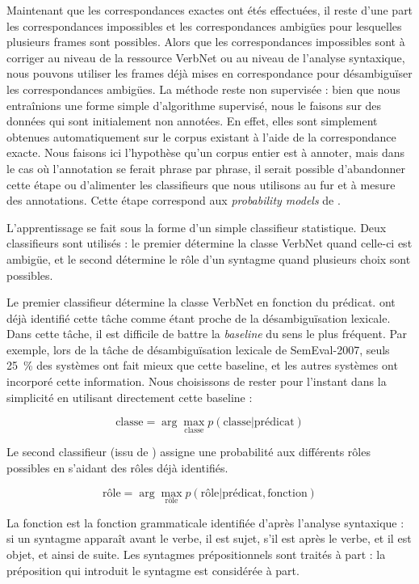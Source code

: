 Maintenant que les correspondances exactes ont étés effectuées, il reste d'une
part les correspondances impossibles et les correspondances ambigües pour
lesquelles plusieurs frames sont possibles. Alors que les correspondances
impossibles sont à corriger au niveau de la ressource VerbNet ou au niveau de
l'analyse syntaxique, nous pouvons utiliser les frames déjà mises en
correspondance pour désambiguïser les correspondances ambigües. La méthode
reste non supervisée : bien que nous entraînions une forme simple d'algorithme
supervisé, nous le faisons sur des données qui sont initialement non annotées.
En effet, elles sont simplement obtenues automatiquement sur le corpus existant
à l'aide de la correspondance exacte. Nous faisons ici l'hypothèse qu'un corpus
entier est à annoter, mais dans le cas où l'annotation se ferait phrase par
phrase, il serait possible d'abandonner cette étape ou d'alimenter les
classifieurs que nous utilisons au fur et à mesure des annotations. Cette étape
correspond aux \textit{probability models} de \citet{swier2004unsupervised}.

L'apprentissage se fait sous la forme d'un simple classifieur statistique. Deux
classifieurs sont utilisés : le premier détermine la classe VerbNet quand
celle-ci est ambigüe, et le second détermine le rôle d'un syntagme quand
plusieurs choix sont possibles.

Le premier classifieur détermine la classe VerbNet en fonction du prédicat.
\citet{abend2008supervised} ont déjà identifié cette tâche comme étant proche
de la désambiguïsation lexicale. Dans cette tâche, il est difficile de battre
la \textit{baseline} du sens le plus fréquent. Par exemple, lors de la tâche de
désambiguïsation lexicale de SemEval-2007, seuls 25~\% des systèmes ont fait
mieux que cette baseline, et les autres systèmes ont incorporé cette
information. Nous choisissons de rester pour l'instant dans la simplicité en
utilisant directement cette baseline :

$$ \text{classe} = \arg\max_{\text{classe}} p(\text{classe} \vert \text{prédicat}) $$

Le second classifieur (issu de \cite{swier2004unsupervised}) assigne une
probabilité aux différents rôles possibles en s'aidant des rôles déjà
identifiés.

$$ \text{rôle} = \arg\max_{\text{rôle}} p(\text{rôle} \vert \text{prédicat}, \text{fonction})$$

La fonction est la fonction grammaticale identifiée d'après l'analyse
syntaxique : si un syntagme apparaît avant le verbe, il est sujet, s'il est
après le verbe, et il est objet, et ainsi de suite. Les syntagmes
prépositionnels sont traités à part : la préposition qui introduit le syntagme
est considérée à part.

